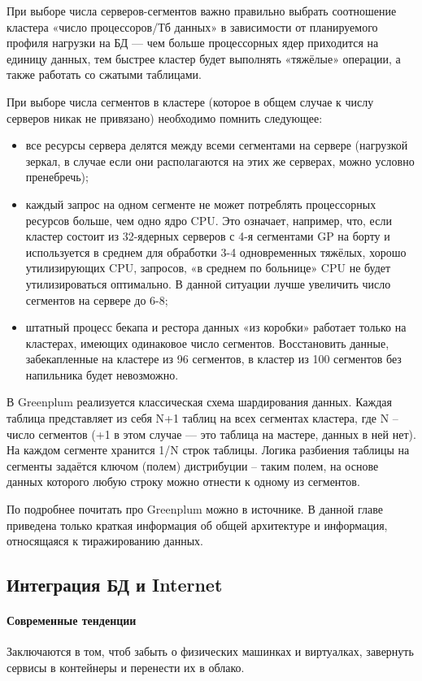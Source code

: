 При выборе числа серверов-сегментов важно правильно выбрать соотношение кластера «число процессоров/Тб данных» в
зависимости от планируемого профиля нагрузки на БД — чем больше процессорных ядер приходится на единицу данных, тем
быстрее кластер будет выполнять «тяжёлые» операции, а также работать со сжатыми таблицами.

При выборе числа сегментов в кластере (которое в общем случае к числу серверов никак не привязано) необходимо помнить
следующее:
\begin{itemize}
    \item все ресурсы сервера делятся между всеми сегментами на сервере (нагрузкой зеркал, в случае если они располагаются на этих же серверах, можно условно пренебречь);
    \item каждый запрос на одном сегменте не может потреблять процессорных ресурсов больше, чем одно ядро CPU. Это означает, например, что, если кластер состоит из 32-ядерных серверов с 4-я сегментами GP на борту и используется в среднем для обработки 3-4 одновременных тяжёлых, хорошо утилизирующих CPU, запросов, «в среднем по больнице» CPU не будет утилизироваться оптимально. В данной ситуации лучше увеличить число сегментов на сервере до 6-8;
    \item штатный процесс бекапа и рестора данных «из коробки» работает только на кластерах, имеющих одинаковое число сегментов. Восстановить данные, забекапленные на кластере из 96 сегментов, в кластер из 100 сегментов без напильника будет невозможно.
\end{itemize}

В Greenplum реализуется классическая схема шардирования данных. Каждая таблица представляет из себя N+1 таблиц на всех
сегментах кластера, где N – число сегментов (+1 в этом случае — это таблица на мастере, данных в ней нет). На каждом
сегменте хранится 1/N строк таблицы. Логика разбиения таблицы на сегменты задаётся ключом (полем) дистрибуции – таким
полем, на основе данных которого любую строку можно отнести к одному из сегментов.

По подробнее почитать про Greenplum можно в источнике. В данной главе приведена только краткая информация об общей
архитектуре и информация, относящаяся к тиражированию данных. \autocite{Greenplum}

\subsection{Интеграция БД и Internet}
\paragraph{Современные тенденции}
Заключаются в том, чтоб забыть о физических машинках и виртуалках, завернуть сервисы в контейнеры и перенести их в облако.

